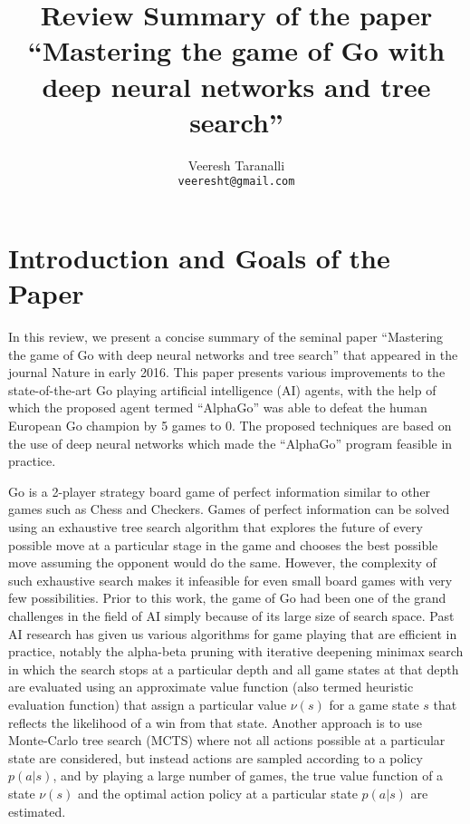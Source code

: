 \documentclass{article} %
\title{Review Summary of the paper ``Mastering the game of Go with deep neural networks and tree search''}
\author{Veeresh Taranalli \\
\texttt{veeresht@gmail.com}
}
\begin{document}
\maketitle


\section{Introduction and Goals of the Paper}
\label{sec:intro}

In this review, we present a concise summary of the seminal paper ``Mastering the game of Go with deep neural networks and tree search'' that appeared in the journal Nature in early 2016.
This paper presents various improvements to the state-of-the-art Go playing artificial intelligence (AI) agents, with the help of which the proposed agent termed ``AlphaGo'' was able to defeat the human European Go champion by 5 games to 0. The proposed techniques are based on the use of deep neural networks which made the ``AlphaGo'' program feasible in practice.

Go is a 2-player strategy board game of perfect information similar to other games such as Chess and Checkers. Games of perfect information can be solved using an exhaustive tree search algorithm that explores the future of every possible move at a particular stage in the game and chooses the best possible move assuming the opponent would do the same. However, the complexity of such exhaustive search makes it infeasible for even small board games with very few possibilities. Prior to this work, the game of Go had been one of the grand challenges in the field of AI simply because of its large size of search space. Past AI research has given us various algorithms for game playing that are efficient in practice, notably the alpha-beta pruning with iterative deepening minimax search in which the search stops at a particular depth and all game states at that depth are evaluated using an approximate value function (also termed heuristic evaluation function) that
assign a particular value $\nu(s)$ for a game state $s$ that reflects the likelihood of a win from that state. Another approach is to use Monte-Carlo tree search (MCTS) where not all actions possible at a particular state are considered, but instead actions are sampled according to a policy $p(a|s)$, and by playing a large number of games, the true value function of a state $\nu(s)$ and the optimal action policy at a particular state $p(a|s)$ are estimated.
\end{document}
